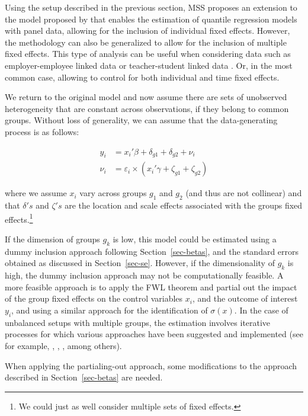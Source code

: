 \documentclass[
  12pt,
  oneside]{article}
\begin{document}
Using the setup described in the previous section, MSS proposes an
extension to the model proposed by \citet{he1997} that enables the
estimation of quantile regression models with panel data, allowing for
the inclusion of individual fixed effects. However, the methodology can
also be generalized to allow for the inclusion of multiple fixed
effects. This type of analysis can be useful when considering data such
as employer-employee linked data \citep{abowed2006} or teacher-student
linked data \citep{harrissass2011}. Or, in the most common case,
allowing to control for both individual and time fixed effects.

We return to the original model and now assume there are sets of
unobserved heterogeneity that are constant across observations, if they
belong to common groups. Without loss of generality, we can assume that
the data-generating process is as follows:

\[\begin{aligned}
  y_{i} &= x_{i}' \beta + \delta_{g1} + \delta_{g2} + \nu_i \\
  \nu_i &= \varepsilon_i \times (x_{i}' \gamma + \zeta_{g1} + \zeta_{g2})   
  \end{aligned}
\]

where we assume \(x_{i}\) vary across groups \(g_1\) and \(g_2\) (and
thus are not collinear) and that \(\delta's\) and \(\zeta's\) are the
location and scale effects associated with the groups fixed
effects.\footnote{We could just as well consider multiple sets of fixed
  effects.}

If the dimension of groups \(g_k\) is low, this model could be estimated
using a dummy inclusion approach following Section~\ref{sec-betas}, and
the standard errors obtained as discussed in Section~\ref{sec-se}.
However, if the dimensionality of \(g_k\) is high, the dummy inclusion
approach may not be computationally feasible. A more feasible approach
is to apply the FWL theorem and partial out the impact of the group
fixed effects on the control variables \(x_{i}\), and the outcome of
interest \(y_{i}\), and using a similar approach for the identification
of \(\sigma(x)\). In the case of unbalanced setups with multiple groups,
the estimation involves iterative processes for which various approaches
have been suggested and implemented (see for example,
\citet{correia_feasible_nodate}, \citet{gaure2013}, \citet{rios2015},
among others).

When applying the partialing-out approach, some modifications to the
approach described in Section~\ref{sec-betas} are needed.
\end{document}
